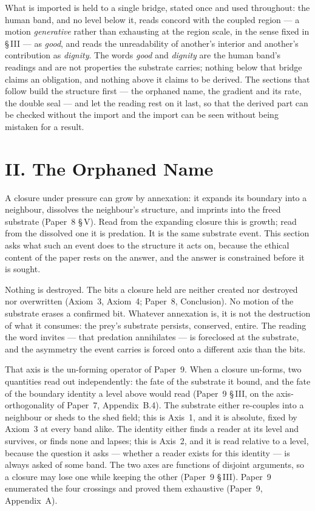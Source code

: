 \documentclass[11pt,oneside]{report}
\theoremstyle{definition}
\theoremstyle{remark}
\begin{document}
What is imported is held to a single bridge, stated once and used throughout: the human band, and no level below it, reads concord with the coupled region --- a motion \emph{generative} rather than exhausting at the region scale, in the sense fixed in \S\,III --- as \emph{good}, and reads the unreadability of another's interior and another's contribution as \emph{dignity}. The words \emph{good} and \emph{dignity} are the human band's readings and are not properties the substrate carries; nothing below that bridge claims an obligation, and nothing above it claims to be derived. The sections that follow build the structure first --- the orphaned name, the gradient and its rate, the double seal --- and let the reading rest on it last, so that the derived part can be checked without the import and the import can be seen without being mistaken for a result.

\section*{II. The Orphaned Name}

A closure under pressure can grow by annexation: it expands its boundary into a neighbour, dissolves the neighbour's structure, and imprints into the freed substrate (Paper~8 \S\,V). Read from the expanding closure this is growth; read from the dissolved one it is predation. It is the same substrate event. This section asks what such an event does to the structure it acts on, because the ethical content of the paper rests on the answer, and the answer is constrained before it is sought.

Nothing is destroyed. The bits a closure held are neither created nor destroyed nor overwritten (Axiom~3, Axiom~4; Paper~8, Conclusion). No motion of the substrate erases a confirmed bit. Whatever annexation is, it is not the destruction of what it consumes: the prey's substrate persists, conserved, entire. The reading the word invites --- that predation annihilates --- is foreclosed at the substrate, and the asymmetry the event carries is forced onto a different axis than the bits.

That axis is the un-forming operator of Paper~9. When a closure un-forms, two quantities read out independently: the fate of the substrate it bound, and the fate of the boundary identity a level above would read (Paper~9 \S\,III, on the axis-orthogonality of Paper~7, Appendix~B.4). The substrate either re-couples into a neighbour or sheds to the shed field; this is Axis~1, and it is absolute, fixed by Axiom~3 at every band alike. The identity either finds a reader at its level and survives, or finds none and lapses; this is Axis~2, and it is read relative to a level, because the question it asks --- whether a reader exists for this identity --- is always asked of some band. The two axes are functions of disjoint arguments, so a closure may lose one while keeping the other (Paper~9 \S\,III). Paper~9 enumerated the four crossings and proved them exhaustive (Paper~9, Appendix~A).
\end{document}
